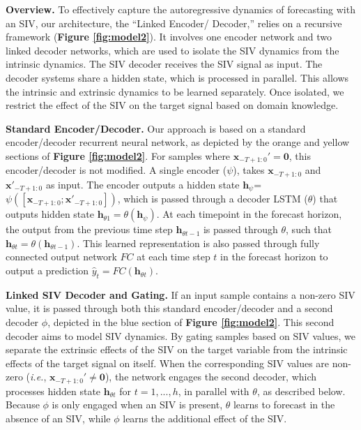 \documentclass[letterpaper]{article}
\begin{document}
  \textbf{Overview.} To effectively capture the autoregressive dynamics of forecasting  with an SIV, our architecture, the ``Linked Encoder/ Decoder,''  relies on a recursive framework (\textbf{Figure \ref{fig:model2}}). It involves one encoder network and two linked decoder networks, which are used to isolate the SIV dynamics from the intrinsic dynamics. The SIV decoder receives the SIV signal as input. The decoder systems share a hidden state, which is processed in parallel. This allows the intrinsic and extrinsic dynamics to be learned separately. Once isolated, we restrict the effect of the SIV on the target signal based on domain knowledge.



\textbf{Standard Encoder/Decoder.} Our approach is based on a standard encoder/decoder recurrent neural network, as depicted by the orange and yellow sections of \textbf{Figure \ref{fig:model2}}. For samples where $\mathbf{x}_{-T+1:0}'=\mathbf{0}$, this encoder/decoder is not modified. A single encoder ($\psi$),  takes  $\mathbf{x}_{-T+1:0}$ and  $\mathbf{x}'_{-T+1:0}$ as input. The encoder outputs a hidden state $\mathbf{h}_{\psi}$= $\psi([\mathbf{x}_{-T+1:0} ; \mathbf{x}'_{-T+1:0}])$, which is passed through a decoder LSTM ($\theta$) that outputs hidden state $\mathbf{h}_{{\theta}1}=\theta(\mathbf{h}_{\psi})$. At each timepoint in the forecast horizon, the output from the previous time step $\mathbf{h}_{{\theta}t-1}$ is passed through $\theta$, such that $\mathbf{h}_{{\theta}t}=\theta(\mathbf{h}_{{\theta}t-1})$. This learned representation is also passed through fully connected output network $FC$ at each time step $t$ in the forecast horizon to output a prediction $\hat{y}_t=FC(\mathbf{h}_{{\theta}t})$.

\textbf{Linked SIV Decoder and Gating.} If an input sample contains a non-zero SIV value, it is passed through both this standard encoder/decoder and a second decoder $\phi$, depicted in the blue section of \textbf{Figure \ref{fig:model2}}. This second decoder aims to model SIV dynamics. By gating samples based on SIV values, we separate the extrinsic effects of the SIV on the target variable from the intrinsic effects of the target signal on itself. When the corresponding SIV values are non-zero (\textit{i.e.}, $\mathbf{x}_{-T+1:0}'\neq \mathbf{0}$), the network engages the second decoder, which processes hidden state $\mathbf{h}_{{\theta}t}$ for $t=1,...,h$, in parallel with $\theta$, as described below. Because $\phi$ is only engaged when an SIV is present, $\theta$ learns to forecast in the absence of an SIV, while $\phi$ learns the additional effect of the SIV.
\end{document}
